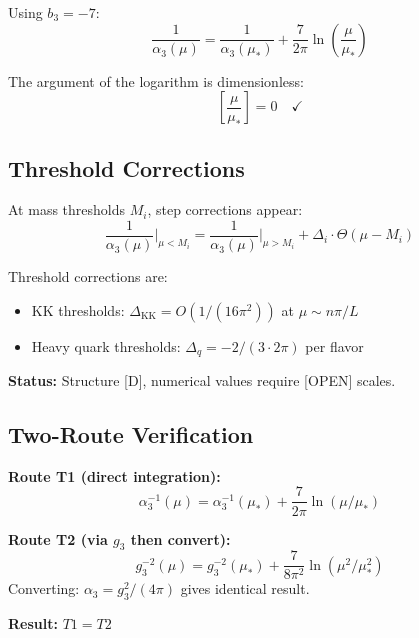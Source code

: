 \documentclass[11pt,a4paper]{article}
\theoremstyle{definition}
\begin{document}
Using $b_3 = -7$:
\begin{equation}
  \label{eq:rg-solution-explicit}
  \frac{1}{\alpha_3(\mu)} = \frac{1}{\alpha_3(\mu_*)} + \frac{7}{2\pi} \ln\left(\frac{\mu}{\mu_*}\right)
\end{equation}

\begin{invariancebox}
The argument of the logarithm is dimensionless:
\begin{equation}
  \label{eq:log-hygiene-rg}
  \left[\frac{\mu}{\mu_*}\right] = 0 \quad \checkmark
\end{equation}
\end{invariancebox}

\subsection{Threshold Corrections}
\label{subsec:thresholds}

At mass thresholds $M_i$, step corrections appear:
\begin{equation}
  \label{eq:threshold-step}
  \frac{1}{\alpha_3(\mu)} \Big|_{\mu < M_i} = \frac{1}{\alpha_3(\mu)} \Big|_{\mu > M_i}
  + \Delta_i \cdot \Theta(\mu - M_i)
\end{equation}

\begin{trapbox}
Threshold corrections are:
\begin{itemize}
  \item KK thresholds: $\Delta_{\text{KK}} = O(1/(16\pi^2))$ at $\mu \sim n\pi/L$
  \item Heavy quark thresholds: $\Delta_q = -2/(3 \cdot 2\pi)$ per flavor
\end{itemize}
\textbf{Status:} Structure [D], numerical values require [OPEN] scales.
\end{trapbox}

\subsection{Two-Route Verification}
\label{subsec:two-route}

\begin{invariancebox}[Scheme Invariance: T1 = T2]
\textbf{Route T1 (direct integration):}
\begin{equation}
  \label{eq:route-t1-rg}
  \alpha_3^{-1}(\mu) = \alpha_3^{-1}(\mu_*) + \frac{7}{2\pi}\ln(\mu/\mu_*)
\end{equation}

\textbf{Route T2 (via $g_3$ then convert):}
\begin{equation}
  \label{eq:route-t2-rg}
  g_3^{-2}(\mu) = g_3^{-2}(\mu_*) + \frac{7}{8\pi^2}\ln(\mu^2/\mu_*^2)
\end{equation}
Converting: $\alpha_3 = g_3^2/(4\pi)$ gives identical result.

\textbf{Result:} $T1 = T2$ \checkmark
\end{invariancebox}
\end{document}
